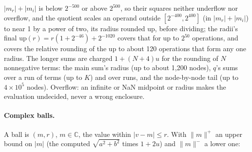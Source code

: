 \documentclass[11pt]{article}
\theoremstyle{definition}
\begin{document}
$|m_r|+|m_i|$ is below $2^{-500}$ or above $2^{500}$, so their squares neither underflow nor overflow, and the
quotient scales an operand outside $[2^{-400},2^{400}]$ (in $|m_r|+|m_i|$) to near 1 by a power of two, its radius
rounded up, before dividing; the radii's final $\mathrm{up}(r)
=r(1+2^{-46})+2^{-1020}$ covers that for up to $2^{50}$ operations, and covers the relative rounding of the
up to about 120 operations that form any one radius. The longer sums are charged $1+(N+4)u$ for the rounding of
$N$ nonnegative terms: the main sum's radius (up to about 1,200 nodes), $q$'s sums over a run of terms (up to $K$)
and over runs, and the node-by-node tail (up to $4\times10^5$ nodes). Overflow: an infinite or NaN midpoint or radius makes the
evaluation undecided, never a wrong enclosure.

\paragraph{Complex balls.} A ball is $(m,r)$, $m\in\mathbb C$, the value within $|v-m|\le r$. With $\|m\|^+$ an
upper bound on $|m|$ (the computed $\sqrt{a^2+b^2}$ times $1+2u$) and $\|m\|^-$ a lower one:
\end{document}
